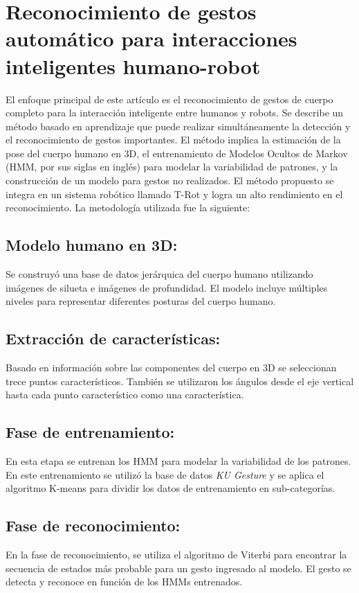 \section*{Reconocimiento de gestos automático para interacciones inteligentes humano-robot}

El enfoque principal de este artículo es el reconocimiento de gestos de cuerpo completo para la interacción inteligente entre humanos y robots. Se describe un método basado en aprendizaje que puede realizar simultáneamente la detección y el reconocimiento de gestos importantes. El método implica la estimación de la pose del cuerpo humano en 3D, el entrenamiento de Modelos Ocultos de Markov (HMM, por sus siglas en inglés) para modelar la variabilidad de patrones, y la construcción de un modelo para gestos no realizados. El método propuesto se integra en un sistema robótico llamado T-Rot y logra un alto rendimiento en el reconocimiento. La metodología utilizada fue la siguiente: 

\subsection*{Modelo humano en 3D:}
Se construyó una base de datos jerárquica del cuerpo humano utilizando imágenes de silueta e imágenes de profundidad. El modelo incluye múltiples niveles para representar diferentes posturas del cuerpo humano. \cite{Lee_2006}

\subsection*{Extracción de características:}
Basado en información sobre las componentes del cuerpo en 3D se seleccionan trece puntos característicos. También se utilizaron los ángulos desde el eje vertical hasta cada punto característico como una característica. \cite{Lee_2006}

\subsection*{Fase de entrenamiento:}
En esta etapa se entrenan los HMM para modelar la variabilidad de los patrones. En este entrenamiento se utilizó la base de datos \textit{KU Gesture} y se aplica el algoritmo K-means para dividir los datos de entrenamiento en sub-categorías. \cite{Lee_2006}

\subsection*{Fase de reconocimiento:}
En la fase de reconocimiento, se utiliza el algoritmo de Viterbi para encontrar la secuencia de estados más probable para un gesto ingresado al modelo. El gesto se detecta y reconoce en función de los HMMs entrenados. \cite{Lee_2006}

